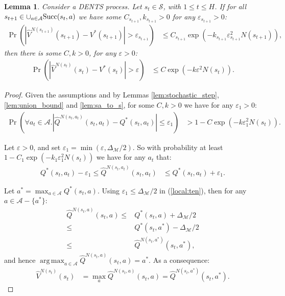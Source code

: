 \documentclass{article}
\newcommand{\cl}[1]{\mathcal{#1}}
\newcommand{\Vt}[2]{\hat{V}^{#2}(#1)}
\newcommand{\Qt}[3]{\hat{Q}^{#3}(#1,#2)}
\newcommand{\suc}[1]{\cup_{a\in\cl{A}}\textnormal{Succ}(#1,a)}
\DeclareMathOperator*{\argmax}{arg\,max}
\theoremstyle{plain}
\newtheorem{lemma}[theorem]{Lemma}
\begin{document}
\begin{appendices}
    
        \begin{lemma} \label{lem:dents_val_induction_step}
            Consider a DENTS process. Let $s_t\in\cl{S}$, with $1\leq t \leq H$. If for all $s_{t+1}\in\suc{s_t}$ we have some $C_{s_{t+1}},k_{s_{t+1}}>0$ for any $\varepsilon_{s_{t+1}}>0$:
            \begin{align}
                \Pr\left(\left| \Vt{s_{t+1}}{N(s_{t+1})} - V^*(s_{t+1}) \right| > \varepsilon_{s_{t+1}} \right) 
                    &\leq C_{s_{t+1}}\exp\left( -k_{s_{t+1}}\varepsilon_{s_{t+1}}^2 N(s_{t+1}) \right), 
            \end{align}
            then there is some $C,k>0$, for any $\varepsilon>0$:
            \begin{align}
                \Pr\left(\left| \Vt{s_{t}}{N(s_{t})} - V^*(s_t) \right| > \varepsilon \right) 
                    &\leq C\exp\left( -k\varepsilon^2 N(s_{t}) \right).
            \end{align}
        \end{lemma}
        \begin{proof}
            Given the assumptions and by Lemmas \ref{lem:stochastic_step}, \ref{lem:union_bound} and \ref{lem:sa_to_s}, for some $C,k>0$ we have for any $\varepsilon_1>0$:
            \begin{align}
                \Pr\left(\forall a_t\in\cl{A}. \left|\Qt{s_t}{a_t}{N(s_t,a_t)}-Q^*(s_t,a_t)\right|\leq \varepsilon_1\right) &> 1-C \exp(-k \varepsilon_1^2 N(s_t)).
            \end{align}
            
            Let $\varepsilon >0$, and set $\varepsilon_1 = \min(\varepsilon,\Delta_{\cl{M}}/2)$. So with probability at least $1-C_1 \exp(-k_1 \varepsilon_1^2 N(s_t))$ we have for any $a_t$ that:
            \begin{align}
                Q^*(s_t,a_t) - \varepsilon_1 \leq \Qt{s_t}{a_t}{N(s_t,a_t)} &\leq Q^*(s_t,a_t) + \varepsilon_1. \label{local:ten}
            \end{align}
            
            Let $a^*=\max_{a\in\cl{A}} Q^*(s_t,a)$. Using $\varepsilon_1 \leq \Delta_{\cl{M}}/2$ in (\ref{local:ten}), then for any $a\in\cl{A}-\{ a^*\}$:
            \begin{align}
                \Qt{s_t}{a}{N(s_t,a)} \leq& Q^*(s_t,a) + \Delta_{\cl{M}}/2 \\
                    \leq& Q^*(s_t,a^*) - \Delta_{\cl{M}}/2 \\
                    \leq& \Qt{s_t}{a^*}{N(s_t,a^*)},
            \end{align}
            and hence $\argmax_{a\in\cl{A}} \Qt{s_t}{a}{N(s_t,a)} = a^*$. As a consequence:
            \begin{align}
                \Vt{s_t}{N(s_t)} &= \max_a \Qt{s_t}{a}{N(s_t,a)} = \Qt{s_t}{a^*}{N(s_t,a^*)}. \label{local:editing_one}
            \end{align}
            

\end{proof}
\end{appendices}
\end{document}

